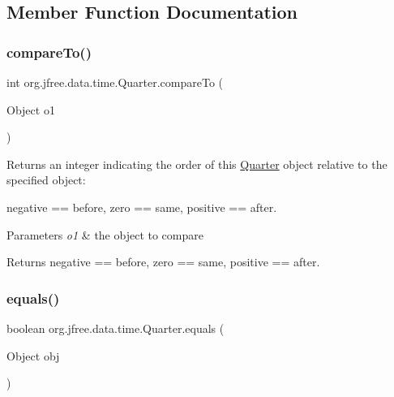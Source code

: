 \subsection{Member Function Documentation}
\mbox{\label{classorg_1_1jfree_1_1data_1_1time_1_1_quarter_adf170bf15940fa2d995bab7db6ad9d28}} 
\subsubsection{\texorpdfstring{compare\+To()}{compareTo()}}
{\footnotesize\ttfamily int org.\+jfree.\+data.\+time.\+Quarter.\+compare\+To (\begin{DoxyParamCaption}\item[{Object}]{o1 }\end{DoxyParamCaption})}

Returns an integer indicating the order of this \mbox{\hyperlink{classorg_1_1jfree_1_1data_1_1time_1_1_quarter}{Quarter}} object relative to the specified object\+:

negative == before, zero == same, positive == after.


\begin{DoxyParams}{Parameters}
{\em o1} & the object to compare\\
\hline
\end{DoxyParams}
\begin{DoxyReturn}{Returns}
negative == before, zero == same, positive == after. 
\end{DoxyReturn}
\mbox{\label{classorg_1_1jfree_1_1data_1_1time_1_1_quarter_ae5cee2e1b6f61afdf6db6dca97b9612b}} 
\subsubsection{\texorpdfstring{equals()}{equals()}}
{\footnotesize\ttfamily boolean org.\+jfree.\+data.\+time.\+Quarter.\+equals (\begin{DoxyParamCaption}\item[{Object}]{obj }\end{DoxyParamCaption})}

